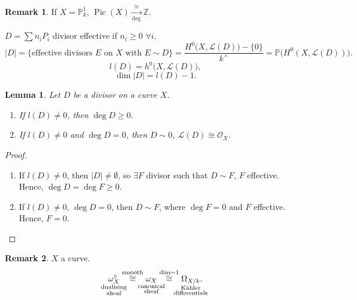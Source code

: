 \documentclass[12pt]{article}
\DeclareMathOperator{\Pic}{Pic}
\newtheorem*{lemma}{Lemma}
\theoremstyle{definition}
\newtheorem*{remark}{Remark}
\theoremstyle{remark}
\newtheorem*{comment}{Comment}
\begin{document}
\begin{remark}
If $X=\mathbb{P}_k^1$, $\Pic(X)\xrightarrow[\deg]{\cong}\mathbb{Z}$.
\end{remark}

$D=\sum n_iP_i$ divisor effective if $n_i\geq0$ $\forall i$.
\[|D|=\{\text{effective divisors }E\text{ on }X\text{ with }E\sim D\}=\frac{H^0\big(X,\mathcal{L}(D)\big)-\{0\}}{k^{\times}}=\mathbb{P}\big(H^0(X,\mathcal{L}(D))\big).\]
\[l(D)=h^0\big(X,\mathcal{L}(D)\big),\]
\[\dim|D|=l(D)-1.\]

\begin{lemma}
Let $D$ be a divisor on a curve $X$.

\begin{enumerate}[label=\arabic*)]
\item If $l(D)\neq0$, then $\deg D\geq0$.

\item If $l(D)\neq0$ and $\deg D=0$, then $D\sim0$, $\mathcal{L}(D)\cong\mathcal{O}_X$.
\end{enumerate}
\end{lemma}

\begin{comment}
This tells that if we want to have a rational function over a curve, we need to admit poles, because otherwise we only have the constant function.
\end{comment}

\begin{proof}
\begin{enumerate}[label=\arabic*)]
\item If $l(D)\neq0$, then $|D|\neq\emptyset$, so $\exists F$ divisor such that $D\sim F$, $F$ effective. Hence, $\deg D=\deg F\geq0$.

\item If $l(D)\neq0$, $\deg D=0$, then $D\sim F$, where $\deg F=0$ and $F$ effective. Hence, $F=0$.
\end{enumerate}
\end{proof}

\begin{remark}
$X$ a curve.
\[\underset{\mathclap{\substack{\text{dualising}\\\text{sheaf}}}}{\omega_X^{\circ}}\overset{\text{smooth}}{\cong}\underset{\mathclap{\substack{\text{canonical}\\\text{sheaf}}}}{\omega_X}\overset{\dim=1}{\cong}\underset{\mathclap{\substack{\text{K\"{a}hler}\\\text{differentials}}}}{\Omega_{X/k}}.\]
\end{remark}
\end{document}
